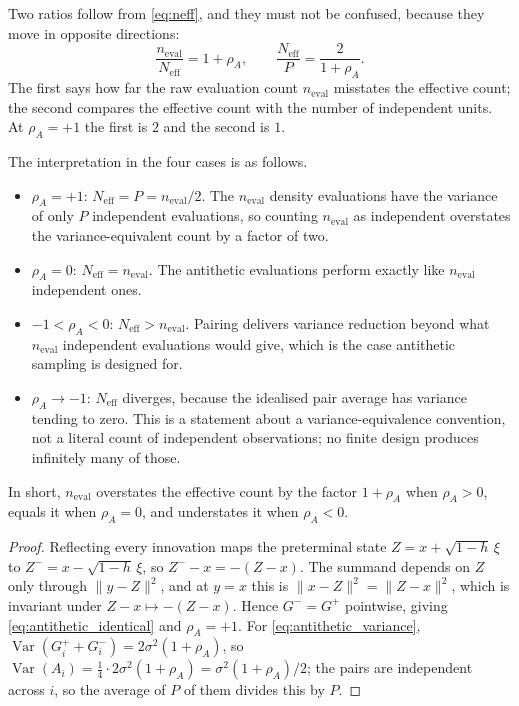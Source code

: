 \documentclass[11pt]{article}
\theoremstyle{definition}
\newcommand{\Var}{\operatorname{Var}}
\newcommand{\neval}{n_{\mathrm{eval}}}
\begin{document}
Two ratios follow from \eqref{eq:neff}, and they must not be confused, because they move in opposite directions:
\begin{equation}\label{eq:neff_ratios}
\frac{\neval}{N_{\mathrm{eff}}}=1+\rho_A,
\qquad
\frac{N_{\mathrm{eff}}}{P}=\frac{2}{1+\rho_A} .
\end{equation}
The first says how far the raw evaluation count $\neval$ misstates the effective count; the second compares the effective count with the number of independent units. At $\rho_A=+1$ the first is $2$ and the second is $1$.

The interpretation in the four cases is as follows.
\begin{itemize}
\item $\rho_A=+1$: $N_{\mathrm{eff}}=P=\neval/2$. The $\neval$ density evaluations have the variance of only $P$ independent evaluations, so counting $\neval$ as independent overstates the variance-equivalent count by a factor of two.
\item $\rho_A=0$: $N_{\mathrm{eff}}=\neval$. The antithetic evaluations perform exactly like $\neval$ independent ones.
\item $-1<\rho_A<0$: $N_{\mathrm{eff}}>\neval$. Pairing delivers variance reduction beyond what $\neval$ independent evaluations would give, which is the case antithetic sampling is designed for.
\item $\rho_A\to-1$: $N_{\mathrm{eff}}$ diverges, because the idealised pair average has variance tending to zero. This is a statement about a variance-equivalence convention, not a literal count of independent observations; no finite design produces infinitely many of those.
\end{itemize}
In short, $\neval$ overstates the effective count by the factor $1+\rho_A$ when $\rho_A>0$, equals it when $\rho_A=0$, and understates it when $\rho_A<0$.

\begin{proof}
Reflecting every innovation maps the preterminal state $Z=x+\sqrt{1-h}\,\xi$ to $Z^-=x-\sqrt{1-h}\,\xi$, so $Z^--x=-(Z-x)$. The summand depends on $Z$ only through $\lVert y-Z\rVert^2$, and at $y=x$ this is $\lVert x-Z\rVert^2=\lVert Z-x\rVert^2$, which is invariant under $Z-x\mapsto-(Z-x)$. Hence $G^{-}=G^{+}$ pointwise, giving \eqref{eq:antithetic_identical} and $\rho_A=+1$. For \eqref{eq:antithetic_variance}, $\Var(G_i^{+}+G_i^{-})=2\sigma^2(1+\rho_A)$, so $\Var(A_i)=\tfrac14\cdot2\sigma^2(1+\rho_A)=\sigma^2(1+\rho_A)/2$; the pairs are independent across $i$, so the average of $P$ of them divides this by $P$.
\end{proof}
\end{document}
